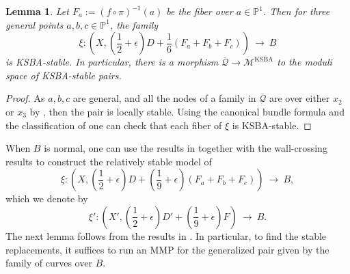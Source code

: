 \documentclass[a4paper,12pt]{amsart}
\newcommand{\cQ}{\mathcal{Q}}
\newcommand{\bP}{{\mathbb P}}
\newcommand\cM{{\mathcal{M}}}
\newtheorem{lemma}[theorem]{Lemma}
\theoremstyle{definition}
\theoremstyle{remark}
\begin{document}
\begin{lemma}
     Let $F_{a}:=(f\circ \pi)^{-1}(a)$ be the fiber over $a\in \bP^1$. Then for three general points $a,b,c\in \bP^1$, the family 
    \[\textstyle 
    \xi\colon \left(X,(\frac{1}{2}+\epsilon)D +\frac{1}{6}(F_a + F_b + F_c) \right)\ \longrightarrow \ B
    \]
    is KSBA-stable. In particular, there is a morphism $\overline{\cQ}\to \cM^{\operatorname{KSBA}}$ to the moduli space of KSBA-stable pairs.
\end{lemma}
\begin{proof}
    As $a,b,c$ are general, and all the nodes of a family in $\overline{\cQ}$ are over either $x_2$ or $x_3$ by , then the pair is locally stable. Using the canonical bundle formula and the classification of  one can check that each fiber of $\xi$ is KSBA-stable.
\end{proof}
When $B$ is normal, one can use the results in  together with the wall-crossing results to construct the relatively stable model of 
\[\textstyle
\xi\colon \left(X,(\frac{1}{2}+\epsilon)D +(\frac{1}{9} +\epsilon)(F_a + F_b + F_c) \right)\ \longrightarrow \ B,
\]
which we denote by 
\[\textstyle 
\xi'\colon \left(X',(\frac{1}{2}+\epsilon)D' +(\frac{1}{9} +\epsilon)F \right)\ \longrightarrow \ B.
\]
The next lemma follows from the results in . In particular, to find the stable replacements, it suffices to run an MMP for the generalized pair given by the family of curves over $B$.
\end{document}
